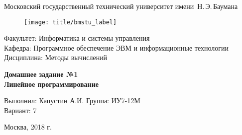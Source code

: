 
\thispagestyle{empty}

\begin{center}
    \Large
    Московский государственный технический университет имени~Н.\,Э.\,Баумана
\end{center}

\begin{figure}[h!]
    \begin{center}
        \texttt{[image: title/bmstu\_label]}
    \end{center}
\end{figure}

{\large
\noindent
Факультет: Информатика и системы управления\\[2mm]
\noindent
Кафедра: Программное обеспечение ЭВМ и информационные технологии\\[2mm]
\noindent
Дисциплина: Методы вычислений
\vspace{1.5cm}}

\begin{center}
    \Large
    \textbf{Домашнее задание №1} \\
    \textbf{Линейное программирование} \\
\end{center}
\vfill

\hfill\begin{minipage}{0.35\textwidth}
    Выполнил: Капустин А.И.
    Группа: ИУ7-12М \\
    Вариант: 7
\end{minipage}
\vfill

\begin{center}
    Москва, 2018 г.
\end{center}